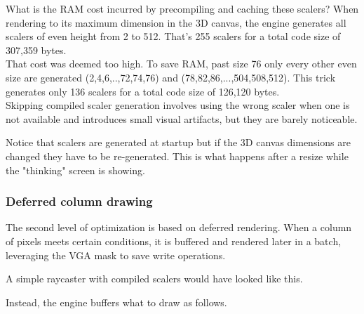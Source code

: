 \par
What is the RAM cost incurred by precompiling and caching these scalers? When rendering to its maximum dimension in the 3D canvas, the engine generates all scalers of even height from 2 to 512. That's 255 scalers for a total code size of 307,359 bytes.\\ That cost was deemed too high. To save RAM, past size 76 only every other even size are generated (2,4,6,..,72,74,76) and (78,82,86,...,504,508,512). This trick generates only 136 scalers for a total code size of 126,120 bytes.\\
Skipping compiled scaler generation involves using the wrong scaler when one is not available and introduces small visual artifacts, but they are barely noticeable.\\
\par
Notice that scalers are generated at startup but if the 3D canvas dimensions are changed they have to be re-generated. This is what happens after a resize while the "thinking" screen is showing.
\begin{figure}[H]
 \centering
\end{figure}







\subsubsection{Deferred column drawing}
The second level of optimization is based on deferred rendering. When a column of pixels meets certain conditions, it is buffered and rendered later in a batch, leveraging the VGA mask to save write operations.\\
\par 
A simple raycaster with compiled scalers would have looked like this.\\

\begin{minipage}{\textwidth}

\end{minipage}
\par
Instead, the engine buffers what to draw as follows.\\
\par
\begin{minipage}{\textwidth}

\end{minipage}

